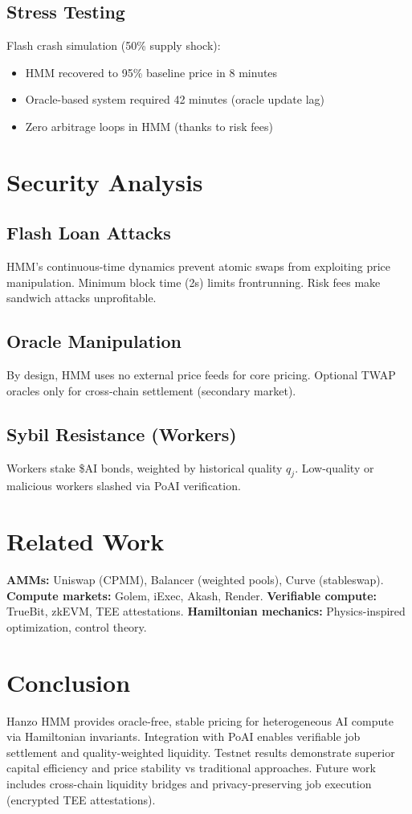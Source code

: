 \documentclass[11pt]{article}
\begin{document}
\subsection{Stress Testing}
Flash crash simulation (50\% supply shock):
\begin{itemize}[leftmargin=1.1em]
  \item HMM recovered to 95\% baseline price in 8 minutes
  \item Oracle-based system required 42 minutes (oracle update lag)
  \item Zero arbitrage loops in HMM (thanks to risk fees)
\end{itemize}

\section{Security Analysis}
\subsection{Flash Loan Attacks}
HMM's continuous-time dynamics prevent atomic swaps from exploiting price manipulation. Minimum block time (2s) limits frontrunning. Risk fees make sandwich attacks unprofitable.

\subsection{Oracle Manipulation}
By design, HMM uses no external price feeds for core pricing. Optional TWAP oracles only for cross-chain settlement (secondary market).

\subsection{Sybil Resistance (Workers)}
Workers stake \$AI bonds, weighted by historical quality \(q_j\). Low-quality or malicious workers slashed via PoAI verification.

\section{Related Work}
\textbf{AMMs:} Uniswap (CPMM), Balancer (weighted pools), Curve (stableswap). \textbf{Compute markets:} Golem, iExec, Akash, Render. \textbf{Verifiable compute:} TrueBit, zkEVM, TEE attestations. \textbf{Hamiltonian mechanics:} Physics-inspired optimization, control theory.

\section{Conclusion}
Hanzo HMM provides oracle-free, stable pricing for heterogeneous AI compute via Hamiltonian invariants. Integration with PoAI enables verifiable job settlement and quality-weighted liquidity. Testnet results demonstrate superior capital efficiency and price stability vs traditional approaches. Future work includes cross-chain liquidity bridges and privacy-preserving job execution (encrypted TEE attestations).
\end{document}
